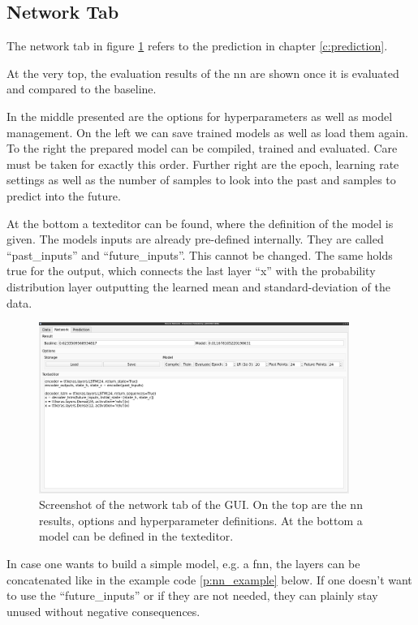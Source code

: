 		\subsection{Network Tab}
		The network tab in figure \ref{f:gui_network_tab} refers to the prediction in chapter \ref{c:prediction}.
		
		At the very top, the evaluation results of the \ac{nn} are shown once it is evaluated and compared to the baseline.
		
		In the middle presented are the options for hyperparameters as well as model management. On the left we can save trained models as well as load them again. To the right the prepared model can be compiled, trained and evaluated. Care must be taken for exactly this order. Further right are the epoch, learning rate settings as well as the number of samples to look into the past and samples to predict into the future.
		
		At the bottom a texteditor can be found, where the definition of the model is given. The models inputs are already pre-defined internally. They are called \enquote{past\_inputs} and \enquote{future\_inputs}. This cannot be changed. The same holds true for the output, which connects the last layer \enquote{x} with the probability distribution layer outputting the learned mean and standard-deviation of the data.
		
		\begin{figure}[htb]
		\centering
		\includegraphics[width=0.9\textwidth]{./4_GUI/gui_network_tab.jpg}
		\caption{Screenshot of the network tab of the GUI. On the top are the \ac{nn} results, options and hyperparameter definitions. At the bottom a model can be defined in the texteditor.}
		\label{f:gui_network_tab}
		\end{figure}

		In case one wants to build a simple model, e.g. a \acf{fnn}, the layers can be concatenated like in the example code \ref{p:nn_example} below. If one doesn't want to use the \enquote{future\_inputs} or if they are not needed, they can plainly stay unused without negative consequences.
		
